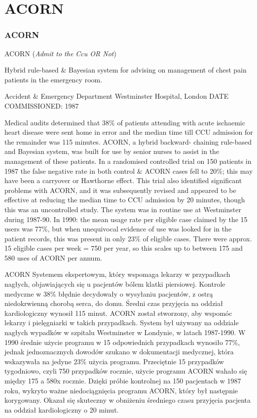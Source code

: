 \section{ACORN}

\begin{frame}
\frametitle{ACORN}
    
ACORN (\textit{Admit to the Ccu OR Not})

Hybrid rule-based \& Bayesian system for advising on management of chest pain patients in the emergency room.

Accident \& Emergency Department Westminster Hospital, London
DATE COMMISSIONED: 1987

Medical audits determined that 38\% of patients attending with acute ischaemic heart disease were sent home in error and the median time till CCU admission for the remainder was 115 minutes. ACORN, a hybrid backward- chaining rule-based and Bayesian system, was built for use by senior nurses to assist in the management of these patients. In a randomised controlled trial on 150 patients in 1987 the false negative rate in both control & ACORN cases fell to 20\%; this may have been a carryover or Hawthorne effect. This trial also identified significant problems with ACORN, and it was subsequently revised and appeared to be effective at reducing the median time to CCU admission by 20 minutes, though this was an uncontrolled study.
The system was in routine use at Westminster during 1987-90. In 1990: the mean usage rate per eligible case claimed by the 15 users was 77\%, but when unequivocal evidence of use was looked for in the patient records, this was present in only 23\% of eligible cases. There were approx. 15 eligible cases per week = 750 per year, so this scales up to between 175 and 580 uses of ACORN per annum.


ACORN
Systemem ekspertowym, który wspomaga lekarzy w przypadkach nagłych,
objawiających się u pacjentów bólem klatki piersiowej. Kontrole medyczne w 38\%
błędnie decydowały o wysyłaniu pacjentów, z ostrą niedokrwienną chorobą serca, do
domu. Średni czas przyjęcia na oddział kardiologiczny wynosił 115 minut. ACORN
został stworzony, aby wspomóc lekarzy i pielęgniarki w takich przypadkach. System
był używany na oddziale nagłych wypadków w szpitalu Westminster w Londynie, w
latach 1987-1990. W 1990 średnie użycie programu w 15 odpowiednich przypadkach
wynosiło 77\%, jednak jednoznacznych dowodów szukano w dokumentacji
medycznej, która wskazywała na jedyne 23\% użycia programu. Przeciętnie 15
przypadków tygodniowo, czyli 750 przypadków rocznie, użycie programu ACORN
wahało się między 175 a 580x rocznie. Dzięki próbie kontrolnej na 150 pacjentach w
1987 roku, wykryto ważne niedociągnięcia programu ACORN, który był następnie
korygowany. Okazał się skuteczny w obniżeniu średniego czasu przyjęcia pacjenta na
oddział kardiologiczny o 20 minut.


\end{frame}
